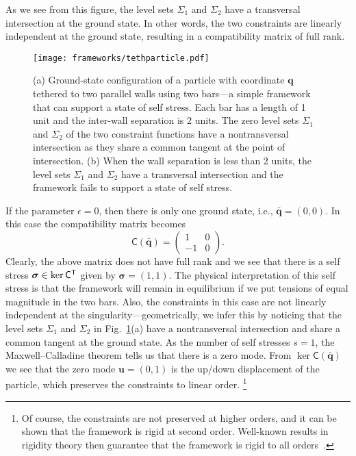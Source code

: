 \begin{example*}
As we see from this figure, the level sets $\Sigma_{1}$ and $\Sigma_{2}$ have a transversal intersection at the ground state.
In other words, the two constraints are linearly independent at the ground state, resulting in a compatibility matrix of full rank.
%
\begin{figure}
  \begin{center}
    \texttt{[image: frameworks/tethparticle.pdf]}
  \end{center}
  \caption{(a) Ground-state configuration of a particle with coordinate $\bm{q}$ tethered to two parallel walls using two bars---a simple framework that can support a state of self stress.
    Each bar has a length of 1 unit and the inter-wall separation is 2 units.
  The zero level sets $\Sigma_1$ and $\Sigma_2$ of the two constraint functions have a nontransversal intersection as they share a common tangent at the point of intersection.
  (b) When the wall separation is less than 2 units, the level sets $\Sigma_{1}$ and $\Sigma_{2}$ have a transversal intersection and the framework fails to support a state of self stress.
}
  \label{fig:tether}
\end{figure}

If the parameter $\epsilon = 0$, then there is only one ground state, i.e., $\bm{\bar{q}} = (0, 0)$.
In this case the compatibility matrix becomes
%
\begin{equation}
  \mathsf{C}(\bar{\bm{q}}) =
  \begin{pmatrix}
    1 & 0\\
    -1 & 0
  \end{pmatrix}.
\end{equation}
%
Clearly, the above matrix does not have full rank and we see that there is a self stress $\bm{\sigma} \in \ker \mathsf{C}^\mathsf{T}$ given by $\bm{\sigma} = (1, 1)$.
The physical interpretation of this self stress is that the framework will remain in equilibrium if we put tensions of equal magnitude in the two bars.
Also, the constraints in this case are not linearly independent at the singularity---geometrically, we infer this by noticing that the level sets $\Sigma_{1}$ and $\Sigma_{2}$ in Fig.~\ref{fig:tether}(a) have a nontransversal intersection and share a common tangent at the ground state.
As the number of self stresses $s = 1$, the Maxwell--Calladine theorem tells us that there is a zero mode.
From $\ker\mathsf{C}(\bar{\bm{q}})$ we see that the zero mode $\bm{u} = (0, 1)$ is the up/down displacement of the particle, which preserves the constraints to linear order.%
\footnote{Of course, the constraints are not preserved at higher orders, and it can be shown that the framework is rigid at second order.  Well-known results in rigidity theory then guarantee that the framework is rigid to all orders~\cite{connelly2022}.}
\end{example*}

